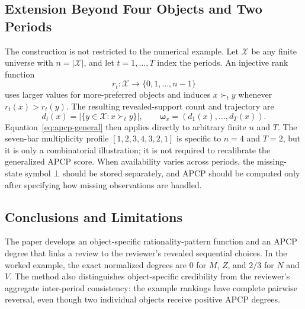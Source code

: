 \documentclass[conference]{IEEEtran}
\theoremstyle{plain}
\theoremstyle{definition}
\theoremstyle{remark}
\begin{document}
	\subsection{Extension Beyond Four Objects and Two Periods}
	The construction is not restricted to the numerical example. Let $\mathcal X$ be any finite universe with $n=\lvert\mathcal X\rvert$, and let $t=1,\ldots,T$ index the periods. An injective rank function
	\begin{equation}
		r_t:\mathcal X\longrightarrow\{0,1,\ldots,n-1\}
	\end{equation}
	uses larger values for more-preferred objects and induces $x\succ_t y$ whenever $r_t(x)>r_t(y)$. The resulting revealed-support count and trajectory are
		\begin{equation}
			d_t(x)=\left|\{y\in\mathcal X:x\succ_t y\}\right|,
			\qquad
			\boldsymbol\omega_x=(d_1(x),\ldots,d_T(x)).
		\end{equation}
	Equation~\eqref{eq:apcp-general} then applies directly to arbitrary finite $n$ and $T$. The seven-bar multiplicity profile $[1,2,3,4,3,2,1]$ is specific to $n=4$ and $T=2$, but it is only a combinatorial illustration; it is not required to recalibrate the generalized APCP score. When availability varies across periods, the missing-state symbol $\bot$ should be stored separately, and APCP should be computed only after specifying how missing observations are handled.
	
	\subsection{Conclusions and Limitations}
	The paper develops an object-specific rationality-pattern function and an APCP degree that links a review to the reviewer’s revealed sequential choices. In the worked example, the exact normalized degrees are $0$ for $M$, $Z$, and $2/3$ for $N$ and $V$. The method also distinguishes object-specific credibility from the reviewer’s aggregate inter-period consistency: the example rankings have complete pairwise reversal, even though two individual objects receive positive APCP degrees.
\end{document}
